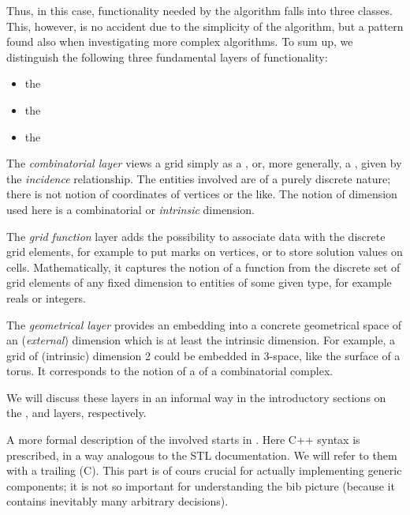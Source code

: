    Thus, in this case, functionality needed by  the algorithm falls
   into three classes. This, however, is no accident due to the simplicity
   of the algorithm, but a pattern found also when investigating 
   more complex algorithms.
  To sum up, we distinguish the following three fundamental layers 
  of functionality:
  \begin{itemize}
  \item  the 
  \item the 
  \item the  
  \end{itemize}
  
  The {\em combinatorial layer\/} views a grid 
  simply as a ,
  or, more generally, a ,
  given by the {\em incidence\/} relationship.
  The entities involved are of  a purely discrete nature;
  there is not notion of coordinates of vertices or the like.
  The notion of dimension used here is a combinatorial or {\em intrinsic\/}
  dimension.
  
  The {\em grid function\/} layer adds the possibility to associate data 
  with the discrete grid elements, 
  for example to put marks on vertices,
  or to store solution values on cells.
  Mathematically, it captures the notion of a function from
  the discrete set of grid elements of any fixed dimension 
  to entities of some given type, for example reals or integers.

  
  The {\em geometrical layer\/} provides an embedding into a concrete geometrical space of 
  an ({\em external\/}) dimension which is at least the intrinsic dimension. 
  For example, a grid of (intrinsic) dimension 2 could be embedded in 3-space,
  like the surface of a torus.
  It corresponds to the notion of a 
  of a combinatorial complex.

  
  We will discuss these layers in an informal way 
  in the introductory sections on the
  , 
 and  layers, respectively.

 A more formal description of the
  involved starts in 
 .
 Here C++ syntax is prescribed, in a way analogous to
 the STL documentation.
 We will refer to them with a trailing (C).
 This part is of cours crucial for actually implementing generic components;
 it is not so important for understanding the bib picture
 (because it contains inevitably many arbitrary decisions).

